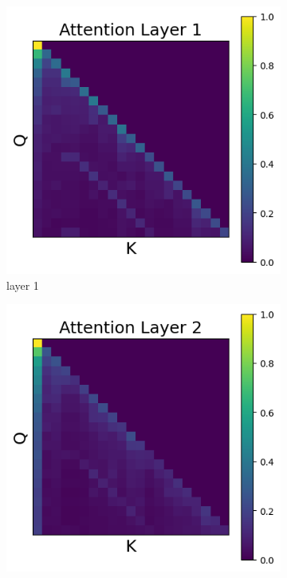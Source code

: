 \documentclass[11pt]{article}
\begin{document}
\subsection{}\label{app:intervention5}
\begin{figure}[t]
  \begin{subfigure}[t]{0.24\textwidth}
    \centering
    \includegraphics[width=1.4\columnwidth]{figures/intervention5/layer_1.png}
    \caption{layer 1}
  \end{subfigure}\hfill
  \begin{subfigure}[t]{0.24\textwidth}
    \centering
    \includegraphics[width=1.4\columnwidth]{figures/intervention5/layer_2.png}

\end{subfigure}
\end{figure}
\end{document}
